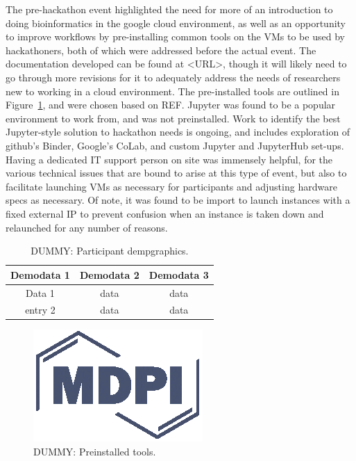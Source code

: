   The pre-hackathon event highlighted the need for more of an introduction to
  doing bioinformatics in the google cloud environment, as well as an
  opportunity to improve workflows by pre-installing common tools on the VMs to
  be used by hackathoners, both of which were addressed before the actual
  event. The documentation developed can be found at <URL>, though it will
  likely need to go through more revisions for it to adequately address the
  needs of researchers new to working in a cloud environment. The pre-installed
  tools are outlined in Figure~\ref{fig:preinstalled_tools}, and were chosen
  based on REF. Jupyter \cite{jupyterNotebook} was found to be a popular
  environment to work from, and was not preinstalled. Work to identify the best
  Jupyter-style solution to hackathon needs is ongoing, and includes
  exploration of github's Binder, Google's CoLab, and custom Jupyter and
  JupyterHub set-ups. Having a dedicated IT support person on site was
  immensely helpful, for the various technical issues that are bound to arise
  at this type of event, but also to facilitate launching VMs as necessary for
  participants and adjusting hardware specs as necessary. Of note, it was found
  to be import to launch instances with a fixed external IP to prevent
  confusion when an instance is taken down and relaunched for any number of
  reasons.

  \begin{table}
    \caption{DUMMY: Participant dempgraphics. \label{fig:participants}}
    \centering
    \begin{tabular}{ccc}
    \toprule
    \textbf{Demodata 1}  & \textbf{Demodata 2}  & \textbf{Demodata 3} \\\midrule
                Data 1   & data                 & data                \\
               entry 2   & data                 & data                \\
    \bottomrule
    \end{tabular}
  \end{table}

  \begin{figure}
    \centering
    \includegraphics{Definitions/logo-mdpi}
    \caption{DUMMY: Preinstalled tools.
            \label{fig:preinstalled_tools}}
  \end{figure}

